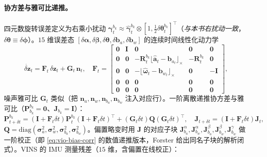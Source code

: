 \paragraph{协方差与雅可比递推。}
四元数旋转误差定义为右乘小扰动 $\boldsymbol{\gamma}^{b_k}_t\approx\hat{\boldsymbol{\gamma}}^{b_k}_t\otimes[1,\tfrac12\delta\boldsymbol{\theta}^{b_k}_t]^\top$（\emph{与本书右扰动一致}，$\delta\boldsymbol{\theta}\equiv\delta\boldsymbol{\phi}$）。$15$ 维误差态 $[\delta\boldsymbol{\alpha},\delta\boldsymbol{\beta},\delta\boldsymbol{\theta},\delta\mathbf{b}_a,\delta\mathbf{b}_w]$ 的连续时间线性化动力学
\begin{equation}
  \dot{\delta\mathbf{z}}_t=\mathbf{F}_t\,\delta\mathbf{z}_t+\mathbf{G}_t\,\mathbf{n}_t,
  \quad
  \mathbf{F}_t=\begin{bmatrix}
  \mathbf{0}&\mathbf{I}&\mathbf{0}&\mathbf{0}&\mathbf{0}\\
  \mathbf{0}&\mathbf{0}&-\mathbf{R}^{b_k}_t\lfloor\hat{\mathbf{a}}_t-\mathbf{b}_{a_t}\rfloor_\times&-\mathbf{R}^{b_k}_t&\mathbf{0}\\
  \mathbf{0}&\mathbf{0}&-\lfloor\hat{\boldsymbol{\omega}}_t-\mathbf{b}_{w_t}\rfloor_\times&\mathbf{0}&-\mathbf{I}\\
  \mathbf{0}&\mathbf{0}&\mathbf{0}&\mathbf{0}&\mathbf{0}\\
  \mathbf{0}&\mathbf{0}&\mathbf{0}&\mathbf{0}&\mathbf{0}
  \end{bmatrix},
  \label{eq:vio-vins-F}
\end{equation}
噪声雅可比 $\mathbf{G}_t$ 类似（把 $\mathbf{n}_a,\mathbf{n}_w,\mathbf{n}_{b_a},\mathbf{n}_{b_w}$ 注入对应行）。一阶离散递推协方差与雅可比（$\mathbf{P}^{b_k}_{b_k}=\mathbf{0}$、$\mathbf{J}_{b_k}=\mathbf{I}$）：
\begin{equation}
  \mathbf{P}^{b_k}_{t+\delta t}=(\mathbf{I}+\mathbf{F}_t\delta t)\mathbf{P}^{b_k}_t(\mathbf{I}+\mathbf{F}_t\delta t)^\top+(\mathbf{G}_t\delta t)\mathbf{Q}(\mathbf{G}_t\delta t)^\top,
  \quad
  \mathbf{J}_{t+\delta t}=(\mathbf{I}+\mathbf{F}_t\delta t)\mathbf{J}_t,
  \label{eq:vio-vins-PJ}
\end{equation}
$\mathbf{Q}=\mathrm{diag}(\boldsymbol{\sigma}_a^2,\boldsymbol{\sigma}_w^2,\boldsymbol{\sigma}_{b_a}^2,\boldsymbol{\sigma}_{b_w}^2)$。偏置略变时用 $\mathbf{J}$ 的对应子块 $\mathbf{J}^\alpha_{b_a},\mathbf{J}^\alpha_{b_w},\mathbf{J}^\beta_{b_a},\mathbf{J}^\beta_{b_w},\mathbf{J}^\gamma_{b_w}$ 做一阶校正（即 \cref{eq:vio-bias-corr} 的数值递推版本，Forster 给出同名子块的解析闭式）。VINS 的 IMU 测量残差（$15$ 维，含偏置在线校正）：
